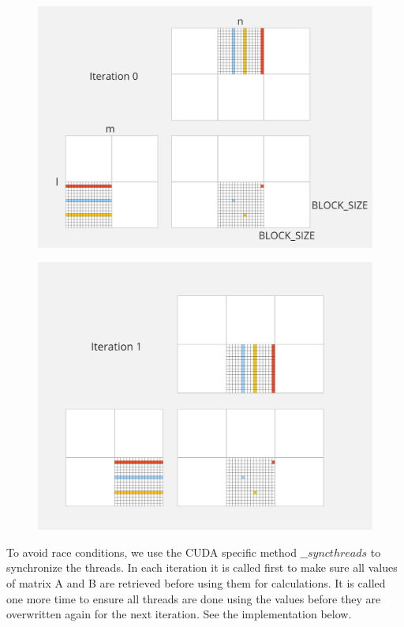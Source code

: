 \begin{figure}[ht]
\includegraphics[width=\textwidth]{Documents/Report/Figures/SharedMemory1.png}
\label{fig:threads and blocks.}
\end{figure}

\begin{figure}[ht]
\includegraphics[width=\textwidth]{Documents/Report/Figures/SharedMemory2.png}
\label{fig:threads and blocks 2.}
\end{figure}

To avoid race conditions, we use the CUDA specific method $\_\_syncthreads$ to synchronize the threads. In each iteration it is called first to make sure all values of matrix A and B are retrieved before using them for calculations. It is called one more time to ensure all threads are done using the values before they are overwritten again for the next iteration. See the implementation below. 

